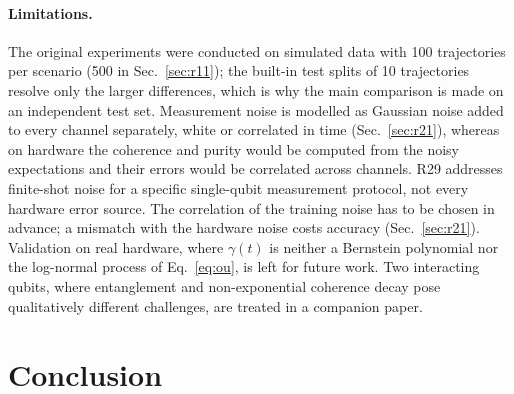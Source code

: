 \documentclass[twocolumn,10pt]{article}
\begin{document}
\paragraph{Limitations.}
The original experiments were conducted on simulated data with 100 trajectories
per scenario (500 in Sec.~\ref{sec:r11}); the built-in test splits of 10
trajectories resolve only the larger differences, which is why the main
comparison is made on an independent test set. Measurement noise is
modelled as Gaussian noise added to every channel separately, white or
correlated in time (Sec.~\ref{sec:r21}), whereas on hardware the coherence
and purity would be computed from the noisy expectations and their errors
would be correlated across channels. R29 addresses finite-shot noise for a
specific single-qubit measurement protocol, not every hardware error source. The correlation of the training
noise has to be chosen in advance; a mismatch with the hardware noise
costs accuracy (Sec.~\ref{sec:r21}).
Validation on real hardware, where $\gamma(t)$ is neither a Bernstein
polynomial nor the log-normal process of Eq.~\ref{eq:ou}, is left for
future work. Two interacting qubits, where entanglement and
non-exponential coherence decay pose qualitatively different challenges,
are treated in a companion paper.

\section{Conclusion}
\end{document}
